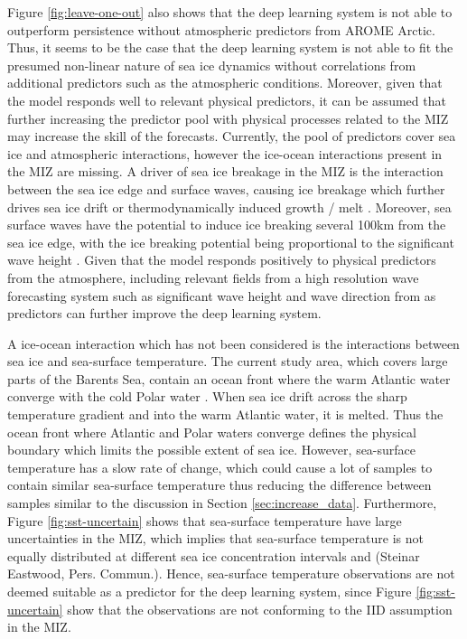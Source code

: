 \documentclass[../main/thesis]{subfiles}
\begin{document}
Figure \ref{fig:leave-one-out} also shows that the deep learning system is not able to outperform persistence without atmospheric predictors from AROME Arctic. Thus, it seems to be the case that the deep learning system is not able to fit the presumed non-linear nature of sea ice dynamics without correlations from additional predictors such as the atmospheric conditions. Moreover, given that the model responds well to relevant physical predictors, it can be assumed that further increasing the predictor pool with physical processes related to the MIZ may increase the skill of the forecasts. Currently, the pool of predictors cover sea ice and atmospheric interactions, however the ice-ocean interactions present in the MIZ are missing. A driver of sea ice breakage in the MIZ is the interaction between the sea ice edge and surface waves, causing ice breakage which further drives sea ice drift or thermodynamically induced growth / melt \citep{Williams2013}. Moreover, sea surface waves have the potential to induce ice breaking several 100km from the sea ice edge, with the ice breaking potential being proportional to the significant wave height \citep{Kohout2014}. Given that the model responds positively to physical predictors from the atmosphere, including relevant fields from a high resolution wave forecasting system such as significant wave height and wave direction from \citet{Carrasco2022} as predictors can further improve the deep learning system. 
 
A ice-ocean interaction which has not been considered is the interactions between sea ice and sea-surface temperature. The current study area, which covers large parts of the Barents Sea, contain an ocean front where the warm Atlantic water converge with the cold Polar water \citep{Johannessen1978}. When sea ice drift across the sharp temperature gradient and into the warm Atlantic water, it is melted. Thus the ocean front where Atlantic and Polar waters converge defines the physical boundary which limits the possible extent of sea ice. However, sea-surface temperature has a slow rate of change, which could cause a lot of samples to contain similar sea-surface temperature thus reducing the difference between samples similar to the discussion in Section \ref{sec:increase_data}. Furthermore, Figure \ref{fig:sst-uncertain} shows that sea-surface temperature have large uncertainties in the MIZ, which implies that sea-surface temperature is not equally distributed at different sea ice concentration intervals \citep{Castro2023} and (Steinar Eastwood, Pers. Commun.). Hence, sea-surface temperature observations are not deemed suitable as a predictor for the deep learning system, since Figure \ref{fig:sst-uncertain} show that the observations are not conforming to the IID assumption in the MIZ.
\end{document}

